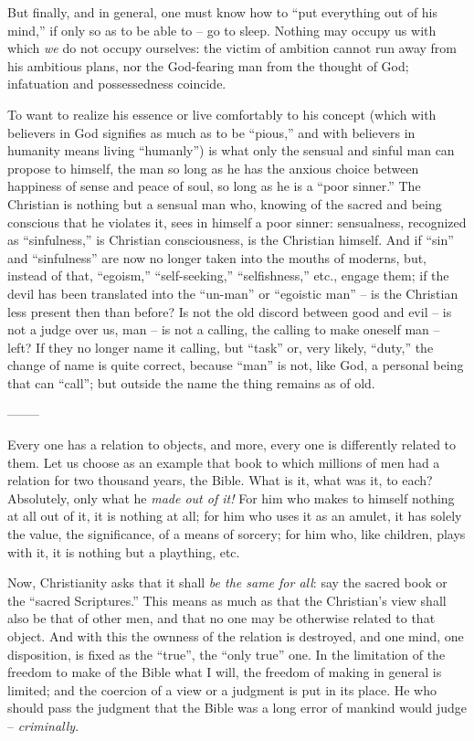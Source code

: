 But finally, and in general, one must know how to ``put everything out of his 
mind,'' if only so as to be able to -- go to sleep. Nothing may occupy us 
with which \textit{we} do not occupy ourselves: the victim of ambition cannot 
run away from his ambitious plans, nor the God-fearing man from the thought of 
God; infatuation and possessedness coincide.

To want to realize his essence or live comfortably to his concept (which with 
believers in God signifies as much as to be ``pious,'' and with believers in 
humanity means living ``humanly'') is what only the sensual and sinful man 
can propose to himself, the man so long as he has the anxious choice between 
happiness of sense and peace of soul, so long as he is a ``poor sinner.'' 
The Christian is nothing but a sensual man who, knowing of the sacred and 
being conscious that he violates it, sees in himself a poor sinner: 
sensualness, recognized as ``sinfulness,'' is Christian consciousness, is 
the Christian himself. And if ``sin'' and ``sinfulness'' are now no longer 
taken into the mouths of moderns, but, instead of that, ``egoism,'' 
``self-seeking,'' ``selfishness,'' etc., engage them; if the devil has 
been translated into the ``un-man'' or ``egoistic man'' -- is the 
Christian less present then than before? Is not the old discord between good 
and evil -- is not a judge over us, man -- is not a calling, the calling to 
make oneself man -- left? If they no longer name it calling, but ``task'' 
or, very likely, ``duty,'' the change of name is quite correct, because 
``man'' is not, like God, a personal being that can ``call''; but outside 
the name the thing remains as of old.

\begin{center}
--------\end{center}


Every one has a relation to objects, and more, every one is differently 
related to them. Let us choose as an example that book to which millions of 
men had a relation for two thousand years, the Bible. What is it, what was it, 
to each? Absolutely, only what he \textit{made out of it!} For him who makes 
to himself nothing at all out of it, it is nothing at all; for him who uses it 
as an amulet, it has solely the value, the significance, of a means of 
sorcery; for him who, like children, plays with it, it is nothing but a 
plaything, etc.

Now, Christianity asks that it shall \textit{be the same for all}: say the 
sacred book or the ``sacred Scriptures.'' This means as much as that the 
Christian's view shall also be that of other men, and that no one may be 
otherwise related to that object. And with this the ownness of the relation is 
destroyed, and one mind, one disposition, is fixed as the ``true'', the 
``only true'' one. In the limitation of the freedom to make of the Bible 
what I will, the freedom of making in general is limited; and the coercion of 
a view or a judgment is put in its place. He who should pass the judgment that 
the Bible was a long error of mankind would judge -- \textit{criminally}.

